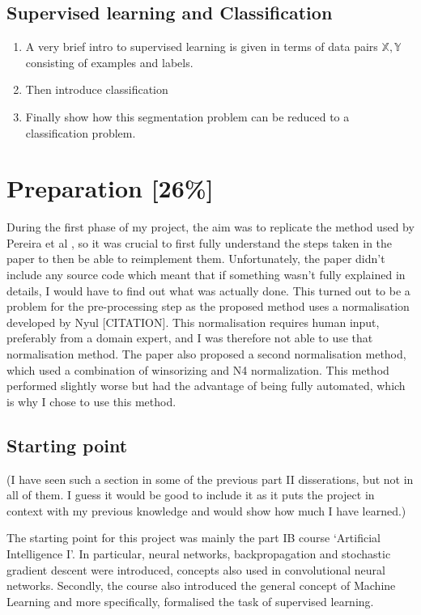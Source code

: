 \documentclass[12pt,a4paper,twoside,openright]{report}
\begin{document}
\section{Supervised learning and Classification}
\begin{enumerate}
	\item A very brief intro to supervised learning is given in terms of data pairs $\mathbb{X}, \mathbb{Y}$ consisting of examples and labels.
	\item Then introduce classification
	\item Finally show how this segmentation problem can be reduced to a classification problem.
\end{enumerate}
\chapter{Preparation [26\%]}
During the first phase of my project, the aim was to replicate the method used by Pereira et al \cite{pereira}, so it was crucial to first fully understand the steps taken in the paper to then be able to reimplement them. Unfortunately, the paper didn't include any source code which meant that if something wasn't fully explained in details, I would have to find out what was actually done. This turned out to be a problem for the pre-processing step as the proposed method uses a normalisation developed by Nyul [CITATION]. This normalisation requires human input, preferably from a domain expert, and I was therefore not able to use that normalisation method. The paper also proposed a second normalisation method, which used a combination of winsorizing and N4 normalization. This method performed slightly worse but had the advantage of being fully automated, which is why I chose to use this method.\\

\section{Starting point}
(I have seen such a section in some of the previous part II disserations, but not in all of them. I guess it would be good to include it as it puts the project in context with my previous knowledge and would show how much I have learned.)

The starting point for this project was mainly the part IB course `Artificial Intelligence I'. In particular, neural networks, backpropagation and stochastic gradient descent were introduced, concepts also used in convolutional neural networks. Secondly, the course also introduced the general concept of Machine Learning and more specifically, formalised the task of supervised learning.
\end{document}
